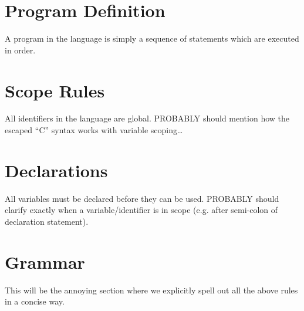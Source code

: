 \section{Program Definition}
A program in the \sys{} language is simply a sequence of statements which
are executed in order.

\section{Scope Rules}
All identifiers in the \sys{} language are global.
PROBABLY should mention how the escaped ``C'' syntax works with variable scoping\ldots

\section{Declarations}
All variables must be declared before they can be used.
PROBABLY should clarify exactly when a variable/identifier is in scope (e.g. after semi-colon of declaration statement).

\section{Grammar}
This will be the annoying section where we explicitly spell out all the above rules
in a concise way.